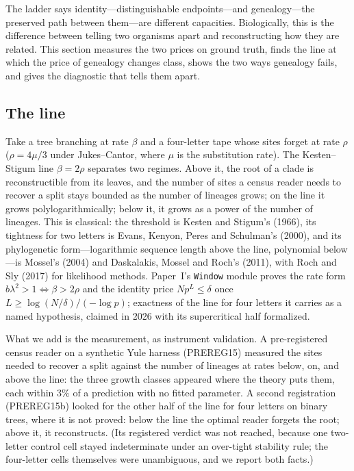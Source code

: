 \documentclass[11pt]{article}
\begin{document}
The ladder says identity---distinguishable endpoints---and genealogy---the preserved path between them---are different capacities. Biologically, this is the difference between telling two organisms apart and reconstructing how they are related. This section measures the two prices on ground truth, finds the line at which the price of genealogy changes class, shows the two ways genealogy fails, and gives the diagnostic that tells them apart.

\subsection{The line}

Take a tree branching at rate $\beta$ and a four-letter tape whose sites forget at rate $\rho$ ($\rho=4\mu/3$ under Jukes--Cantor, where $\mu$ is the substitution rate). The Kesten--Stigum line $\beta=2\rho$ separates two regimes. Above it, the root of a clade is reconstructible from its leaves, and the number of sites a census reader needs to recover a split stays bounded as the number of lineages grows; on the line it grows polylogarithmically; below it, it grows as a power of the number of lineages. This is classical: the threshold is Kesten and Stigum's (1966), its tightness for two letters is Evans, Kenyon, Peres and Schulman's (2000), and its phylogenetic form---logarithmic sequence length above the line, polynomial below---is Mossel's (2004) and Daskalakis, Mossel and Roch's (2011), with Roch and Sly (2017) for likelihood methods. Paper~I's \texttt{Window} module proves the rate form $b\lambda^2>1\iff\beta>2\rho$ and the identity price $N p^L\le\delta$ once $L\ge\log(N/\delta)/(-\log p)$; exactness of the line for four letters it carries as a named hypothesis, claimed in 2026 with its supercritical half formalized.

What we add is the measurement, as instrument validation. A pre-registered census reader on a synthetic Yule harness (PREREG15) measured the sites needed to recover a split against the number of lineages at rates below, on, and above the line: the three growth classes appeared where the theory puts them, each within 3\% of a prediction with no fitted parameter. A second registration (PREREG15b) looked for the other half of the line for four letters on binary trees, where it is not proved: below the line the optimal reader forgets the root; above it, it reconstructs. (Its registered verdict was not reached, because one two-letter control cell stayed indeterminate under an over-tight stability rule; the four-letter cells themselves were unambiguous, and we report both facts.)
\end{document}
